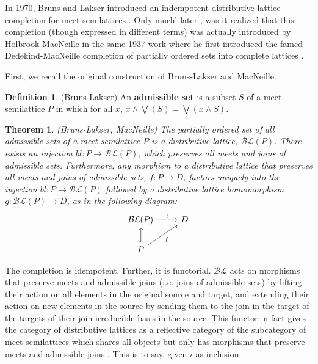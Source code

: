 \documentclass[hoptionsi,review,format=acmsmall]{acmart}
\newtheorem{theorem}{Theorem}[section]
\theoremstyle{definition}
\newtheorem{definition}{Definition}[section]
\newcommand{\BLc}{\mathcal{BL}}
\begin{document}
In 1970, Bruns and Lakser introduced an indempotent distributive lattice completion for meet-semilattices \cite{bruns1970injective}. Only muchl later \cite{ball2016dedekind}, was it realized that this completion (though expressed in different terms) was actually introduced by  Holbrook MacNeille in the same 1937 work where he first introduced the famed Dedekind-MacNeille completion of partially ordered sets into complete lattices \cite{macneille1937partially}. 

First, we recall the original construction of Bruns-Lakser and MacNeille.

\begin{definition}
(Bruns-Lakser) An \textbf{admissible set} is a subset \(S\) of a meet-semilattice \(P\) in which for all \(x\), \(x \wedge \bigvee(S) = \bigvee(x \wedge S)\).
\end{definition}

\begin{theorem}
(Bruns-Lakser, MacNeille) The partially ordered set of all admissible sets of a meet-semilattice \(P\) is a distributive lattice, \(\BLc(P)\). There exists an injection \(bl : P \rightarrow \BLc(P)\), which preserves all meets and joins of admissible sets. Furthermore, any morphism to a distributive lattice that preserves all meets and joins of admissible sets, \(f : P \rightarrow D\), factors uniquely into the injection \(bl : P \rightarrow \BLc(P)\) followed by a distributive lattice homomorphism \(g : \BLc(P) \rightarrow D\), as in the following diagram:
\begin{equation*}
\begin{tikzcd}
\BLc(P) \arrow[r, "!",dashed]            & D \\
P \arrow[u, hook] \arrow[ru, "f"'] &
\end{tikzcd}
\end{equation*}

\end{theorem}

The completion is idempotent. Further, it is functorial. \(\BLc\) acts on morphisms that preserve meets and admissible joins (i.e. joins of admissible sets) by lifting their action on all elements in the original source and target, and extending their action on new elements in the source by sending them to the join in the target of the targets of their join-irreducible basis in the source. This functor in fact gives the category of distributive lattices as a reflective category of the subcategory of meet-semilattices which shares all objects but only has morphisms that preserve meets and admissible joins \cite{gehrke2014distributive}. This is to say, given \(i\) as inclusion:
\end{document}

